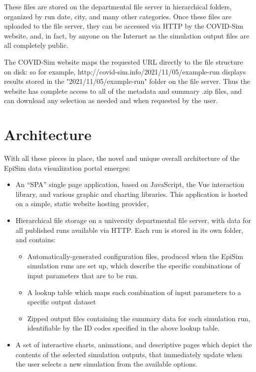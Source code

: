 These files are stored on the departmental file server in hierarchical folders, organized by run date, city, and many other categories. Once these files are uploaded to the file server, they can be accessed via HTTP by the COVID-Sim website, and, in fact, by anyone on the Internet as the simulation output files are all completely public.

The COVID-Sim website maps the requested URL directly to the file structure on disk: so for example, http://covid-sim.info/2021/11/05/example-run displays results stored in the "2021/11/05/example-run" folder on the file server. Thus the website has complete access to all of the metadata and summary .zip files, and can download any selection as needed and when requested by the user.

\hypertarget{covid-architecture}{%
\section{Architecture}\label{architecture}}

With all these pieces in place, the novel and unique overall architecture of the EpiSim data visualization portal emerges:

\begin{itemize}
\item
  An ``SPA'' single page application, based on JavaScript, the Vue interaction library, and various graphic and charting libraries. This application is hosted on a simple, static website hosting provider,
\item
  Hierarchical file storage on a university departmental file server,
  with data for all published runs available via HTTP. Each run is
  stored in its own folder, and contains:

  \begin{itemize}
  \item
    Automatically-generated configuration files, produced when the
    EpiSim simulation runs are set up, which describe the specific
    combinations of input parameters that are to be run.
  \item
    A lookup table which maps each combination of input parameters to a
    specific output dataset
  \item
    Zipped output files containing the summary data for each simulation
    run, identifiable by the ID codes specified in the above lookup table.
  \end{itemize}
\item
  A set of interactive charts, animations, and descriptive pages which depict the
  contents of the selected simulation outputs, that immediately update when the user
  selects a new simulation from the available options.
\end{itemize}

